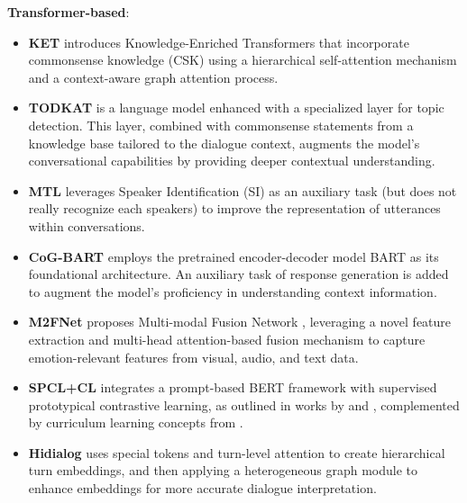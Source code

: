 \documentclass[conference]{IEEEtran}
\begin{document}
\textbf{Transformer-based}: 
\begin{itemize}
\item \textbf{KET} \cite{zhong2019knowledge} introduces Knowledge-Enriched Transformers that incorporate commonsense knowledge (CSK) using a hierarchical self-attention mechanism and a context-aware graph attention process.

\item \textbf{TODKAT} \cite{zhu2021kat} is a language model enhanced with a specialized layer for topic detection. This layer, combined with commonsense statements from a knowledge base tailored to the dialogue context, augments the model's conversational capabilities by providing deeper contextual understanding.
\item \textbf{MTL} \cite{li2020multi} leverages Speaker Identification (SI) as an auxiliary task (but does not really recognize each speakers) to improve the representation of utterances within conversations.
\item \textbf{CoG-BART} \cite{li2021contrast} employs the pretrained encoder-decoder model BART as its foundational architecture. An auxiliary task of response generation is added to augment the model's proficiency in understanding context information.
\item \textbf{M2FNet} \cite{chudasama2022m2fnet} proposes Multi-modal Fusion Network , leveraging a novel feature extraction and multi-head attention-based fusion mechanism to capture emotion-relevant features from visual, audio, and text data.
\item \textbf{SPCL+CL} \cite{song2022supervised} integrates a prompt-based BERT framework with supervised prototypical contrastive learning, as outlined in works by  and , complemented by curriculum learning concepts from .
\item \textbf{Hidialog} \cite{liu2023hierarchical} uses special tokens and turn-level attention to create hierarchical turn embeddings, and then applying a heterogeneous graph module to enhance embeddings for more accurate dialogue interpretation.
\end{itemize}
\end{document}
